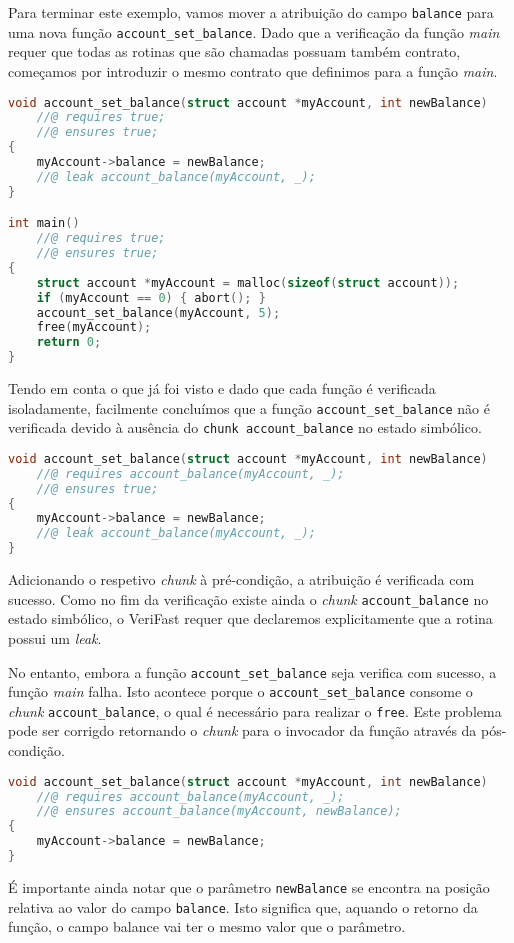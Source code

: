Para terminar este exemplo, vamos mover a atribuição do campo \texttt{balance} para uma nova função \texttt{account\_set\_balance}. Dado que a verificação da função \textit{main} requer que todas as rotinas que são chamadas possuam também contrato, começamos por introduzir o mesmo contrato que definimos para a função \textit{main}.
\begin{lstlisting}[language=C]
void account_set_balance(struct account *myAccount, int newBalance)
    //@ requires true;
    //@ ensures true;
{
    myAccount->balance = newBalance;
    //@ leak account_balance(myAccount, _);
}

int main()
    //@ requires true;
    //@ ensures true;
{
    struct account *myAccount = malloc(sizeof(struct account));
    if (myAccount == 0) { abort(); }
    account_set_balance(myAccount, 5);
    free(myAccount);
    return 0;
}
\end{lstlisting}
Tendo em conta o que já foi visto e dado que cada função é verificada isoladamente, facilmente concluímos que a função \texttt{account\_set\_balance} não é verificada devido à ausência do \texttt{chunk account\_balance} no estado simbólico.
\begin{lstlisting}[language=C]
void account_set_balance(struct account *myAccount, int newBalance)
    //@ requires account_balance(myAccount, _);
    //@ ensures true;
{
    myAccount->balance = newBalance;
    //@ leak account_balance(myAccount, _);
}
\end{lstlisting}
Adicionando o respetivo \textit{chunk} à pré-condição, a atribuição é verificada com sucesso. Como no fim da verificação existe ainda o \textit{chunk} \texttt{account\_balance} no estado simbólico, o VeriFast requer que declaremos explicitamente que a rotina possui um \textit{leak}.

No entanto, embora a função \texttt{account\_set\_balance} seja verifica com sucesso, a função \textit{main} falha. Isto acontece porque o \texttt{account\_set\_balance} consome o \textit{chunk} \texttt{account\_balance}, o qual é necessário para realizar o \texttt{free}. Este problema pode ser corrigdo retornando o \textit{chunk} para o invocador da função através da pós-condição.
\begin{lstlisting}[language=C]
void account_set_balance(struct account *myAccount, int newBalance)
    //@ requires account_balance(myAccount, _);
    //@ ensures account_balance(myAccount, newBalance);
{
    myAccount->balance = newBalance;
}
\end{lstlisting}
É importante ainda notar que o parâmetro \texttt{newBalance} se encontra na posição relativa ao valor do campo \texttt{balance}. Isto significa que, aquando o retorno da função, o campo balance vai ter o mesmo valor que o parâmetro. \\


